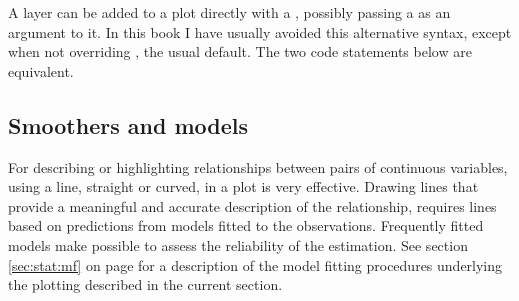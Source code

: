 \documentclass[krantz2]{krantz}\usepackage{knitr}
\begin{document}
\begin{explainbox}
A layer can be added to a plot directly with a , possibly passing a  as an argument to it. In this book I have usually avoided this alternative syntax, except when not overriding , the usual default. The two code statements below are equivalent.

\begin{knitrout}\footnotesize
{}\color{fgcolor}\begin{kframe}
\begin{alltt}
\hlstd{(}   \hlstd{=} \hlstd{(}    \hlopt{+}
  \hlstd{(} \hlstd{=} \hlstd{,}  

\hlstd{(}   \hlstd{=} \hlstd{(}    \hlopt{+}
  \hlstd{(} \hlstd{=} \hlstd{,}  
\end{alltt}
\end{kframe}
\end{knitrout}
\end{explainbox}

\subsection{Smoothers and models}\label{sec:plot:smoothers}

For describing or highlighting relationships between pairs of continuous variables, using a line, straight or curved, in a plot is very effective. Drawing lines that provide a meaningful and accurate description of the relationship, requires lines based on predictions from models fitted to the observations. Frequently fitted models make possible to assess the reliability of the estimation. See section \ref{sec:stat:mf} on page \pageref{sec:stat:mf} for a description of the model fitting procedures underlying the plotting described in the current section.
\end{document}
